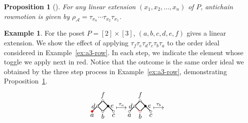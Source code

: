 \documentclass[10pt]{amsart}
\newtheorem{prop}[theo]{Proposition}
\theoremstyle{definition}
\newtheorem{exam}[theo]{Example}
\newcommand\rowm{\rho}
\newcommand\rowA{\rowm_{\mathcal{A}}}
\begin{document}
\begin{prop}[{\cite[Prop.~2.24]{antichain-toggling}}]\label{prop:row-toggles-anti}
For any linear extension $(x_1,x_2,\dots,x_n)$ of $P$, antichain rowmotion is given by
$\rowA = \tau_{x_n} \cdots \tau_{x_2} \tau_{x_1}$.
\end{prop}

\begin{exam}\label{ex:row-toggles-anti}
For the poset
$P=[2]\times[3]$, $(a,b,c,d,e,f)$ gives a linear extension.
We show the effect of applying $\tau_f \tau_e \tau_d \tau_c \tau_b \tau_a$ to the order ideal considered in Example~\ref{ex:a3-row}.
In each step, we indicate the element whose toggle we apply next in {\color{red}red}.
Notice that the outcome is the same order ideal we obtained by the three step process in Example~\ref{ex:a3-row}, demonstrating Proposition~\ref{prop:row-toggles-anti}.
\[
\begin{tikzpicture}[scale=0.274]
\begin{scope}[shift={(0,-4)}]
\draw[thick] (-0.1, 1.9) -- (-0.9, 1.1);
\draw[thick] (0.1, 1.9) -- (0.9, 1.1);
\draw[thick] (-1.1, 0.9) -- (-1.9, 0.1);
\draw[thick] (-0.9, 0.9) -- (-0.1, 0.1);
\draw[thick] (0.9, 0.9) -- (0.1, 0.1);
\draw[thick] (1.1, 0.9) -- (1.9, 0.1);
\draw (0,2) circle [radius=0.2];
\draw (-1,1) circle [radius=0.2];
\draw[fill] (1,1) circle [radius=0.2];
\draw[red,fill] (-2,0) circle [radius=0.2];
\draw (0,0) circle [radius=0.2];
\draw (2,0) circle [radius=0.2];
\node[above] at (0,2) {$f$};
\node[left] at (-1,1) {$d$};
\node[right] at (1,1) {$e$};
\node[below] at (-2,0) {$a$};
\node[below] at (0,0) {$b$};
\node[below] at (2,0) {$c$};
\end{scope}
\node at (3.5,-3) {$\stackrel{\tau_a}{\longmapsto}$};
\begin{scope}[shift={(7,-4)}]
\draw[thick] (-0.1, 1.9) -- (-0.9, 1.1);
\draw[thick] (0.1, 1.9) -- (0.9, 1.1);
\draw[thick] (-1.1, 0.9) -- (-1.9, 0.1);
\draw[thick] (-0.9, 0.9) -- (-0.1, 0.1);
\draw[thick] (0.9, 0.9) -- (0.1, 0.1);
\draw[thick] (1.1, 0.9) -- (1.9, 0.1);
\draw (0,2) circle [radius=0.2];
\draw (-1,1) circle [radius=0.2];
\draw[fill] (1,1) circle [radius=0.2];
\draw (-2,0) circle [radius=0.2];
\draw[red] (0,0) circle [radius=0.2];
\draw (2,0) circle [radius=0.2];
\node[above] at (0,2) {$f$};
\node[left] at (-1,1) {$d$};
\node[right] at (1,1) {$e$};
\node[below] at (-2,0) {$a$};
\node[below] at (0,0) {$b$};
\node[below] at (2,0) {$c$};
\end{scope}
\node at (10.5,-3) {$\stackrel{\tau_b}{\longmapsto}$};

\end{tikzpicture}\]
\end{exam}
\end{document}
